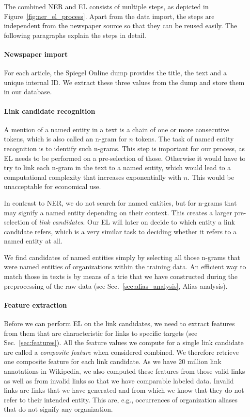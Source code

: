 The combined NER and EL consists of multiple steps, as depicted in Figure~\ref{fig:ner_el_process}. Apart from the data import, the steps are independent from the newspaper source so that they can be reused easily. The following paragraphs explain the steps in detail.


\paragraph{Newspaper import}
For each article, the Spiegel Online dump provides the title, the text and a unique internal ID. We extract these three values from the dump and store them in our database.


\paragraph{Link candidate recognition}
A mention of a named entity in a text is a chain of one or more consecutive tokens, which is also called an n-gram for $n$ tokens. The task of named entity recognition is to identify such n-grams. This step is important for our process, as EL needs to be performed on a pre-selection of those. Otherwise it would have to try to link each n-gram in the text to a named entity, which would lead to a computational complexity that increases exponentially with $n$. This would be unacceptable for economical use.

In contrast to NER, we do not search for named entities, but for n-grams that may signify a named entity depending on their context. This creates a larger pre-selection of \textit{link candidates}. Our EL will later on decide to which entity a link candidate refers, which is a very similar task to deciding whether it refers to a named entity at all.

We find candidates of named entities simply by selecting all those n-grams that were named entities of organizations within the training data. An efficient way to match those in texts is by means of a trie that we have constructed during the preprocessing of the raw data (see Sec.~\ref{sec:alias_analysis}, Alias analysis).


\paragraph{Feature extraction}
Before we can perform EL on the link candidates, we need to extract features from them that are characteristic for links to specific targets (see Sec.~\ref{sec:features}). All the feature values we compute for a single link candidate are called a \textit{composite feature} when considered combined. We therefore retrieve one composite feature for each link candidate. As we have 20 million link annotations in Wikipedia, we also computed these features from those valid links as well as from invalid links so that we have comparable labeled data. Invalid links are links that we have generated and from which we know that they do not refer to their intended entity. This are, e.g., occurrences of organization aliases that do not signify any organization.


